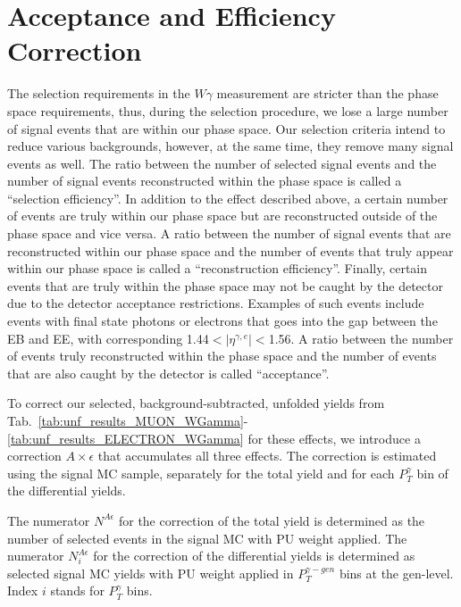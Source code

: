 \section{Acceptance and Efficiency Correction}
\label{sec:AccXEff}

The selection requirements in the $W\gamma$ measurement are stricter than the phase space requirements, thus, during the selection procedure, we lose a large number of signal events that are within our phase space. Our selection criteria intend to reduce various backgrounds, however, at the same time, they remove many signal events as well. The ratio between the number of selected signal events and the number of signal events reconstructed within the phase space is called a ``selection efficiency''. In addition to the effect described above, a certain number of events are truly within our phase space but are reconstructed outside of the phase space and vice versa. A ratio between the number of signal events that are reconstructed within our phase space and the number of events that truly appear within our phase space is called a ``reconstruction efficiency''. Finally, certain events that are truly within the phase space may not be caught by the detector due to the detector acceptance restrictions. Examples of such events include events with final state photons or electrons that goes into the gap between the EB and EE, with corresponding 1.44$<|\eta^{\gamma,e}|<$1.56. A ratio between the number of events truly reconstructed within the phase space and the number of events that are also caught by the detector is called ``acceptance''.  

To correct our selected, background-subtracted, unfolded yields from Tab.~\ref{tab:unf_results_MUON_WGamma}-\ref{tab:unf_results_ELECTRON_WGamma} for these effects, we introduce a correction $A \times \epsilon$ that accumulates all three effects. The correction is estimated using the signal MC sample, separately for the total yield and for each $P_T^{\gamma}$ bin of the differential yields. 

The numerator $N^{A\epsilon}$ for the correction of the total yield is determined as the number of selected events in the signal MC with PU weight applied. The numerator $N^{A\epsilon}_i$ for the correction of the differential yields is determined as selected signal MC yields with PU weight applied in $P_T^{\gamma-gen}$ bins at the gen-level. Index $i$ stands for $P_T^{\gamma}$ bins.

